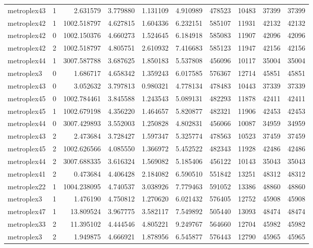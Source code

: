\begin{longtable}{|l|r|r|r|r|r|r|r|r|r|}
metroplex43 & 1 & 2.631579 & 3.779880 & 1.131109 & 4.910989 & 478523 & 10483 & 37399 & 37399 \\
metroplex42 & 1 & 1002.518797 & 4.627815 & 1.604336 & 6.232151 & 585107 & 11931 & 42132 & 42132 \\
metroplex42 & 0 & 1002.150376 & 4.660273 & 1.524645 & 6.184918 & 585083 & 11907 & 42096 & 42096 \\
metroplex42 & 2 & 1002.518797 & 4.805751 & 2.610932 & 7.416683 & 585123 & 11947 & 42156 & 42156 \\
metroplex44 & 1 & 3007.587788 & 3.687625 & 1.850183 & 5.537808 & 456096 & 10117 & 35004 & 35004 \\
metroplex3 & 0 & 1.686717 & 4.658342 & 1.359243 & 6.017585 & 576367 & 12714 & 45851 & 45851 \\
metroplex43 & 0 & 3.052632 & 3.797813 & 0.980321 & 4.778134 & 478483 & 10443 & 37339 & 37339 \\
metroplex45 & 0 & 1002.784461 & 3.845588 & 1.243543 & 5.089131 & 482293 & 11878 & 42411 & 42411 \\
metroplex45 & 1 & 1002.679198 & 4.356220 & 1.464657 & 5.820877 & 482321 & 11906 & 42453 & 42453 \\
metroplex44 & 0 & 3007.429893 & 3.552003 & 1.250828 & 4.802831 & 456066 & 10087 & 34959 & 34959 \\
metroplex43 & 2 & 2.473684 & 3.728427 & 1.597347 & 5.325774 & 478563 & 10523 & 37459 & 37459 \\
metroplex45 & 2 & 1002.626566 & 4.085550 & 1.366972 & 5.452522 & 482343 & 11928 & 42486 & 42486 \\
metroplex44 & 2 & 3007.688335 & 3.616324 & 1.569082 & 5.185406 & 456122 & 10143 & 35043 & 35043 \\
metroplex41 & 2 & 0.473684 & 4.406428 & 2.184082 & 6.590510 & 551842 & 13251 & 48312 & 48312 \\
metroplex22 & 1 & 1004.238095 & 4.740537 & 3.038926 & 7.779463 & 591052 & 13386 & 48860 & 48860 \\
metroplex3 & 1 & 1.476190 & 4.750812 & 1.270620 & 6.021432 & 576405 & 12752 & 45908 & 45908 \\
metroplex47 & 1 & 13.809524 & 3.967775 & 3.582117 & 7.549892 & 505440 & 13093 & 48474 & 48474 \\
metroplex33 & 2 & 11.395102 & 4.444546 & 4.805221 & 9.249767 & 564660 & 12704 & 45982 & 45982 \\
metroplex3 & 2 & 1.949875 & 4.666921 & 1.878956 & 6.545877 & 576443 & 12790 & 45965 & 45965 \\

\end{longtable}
